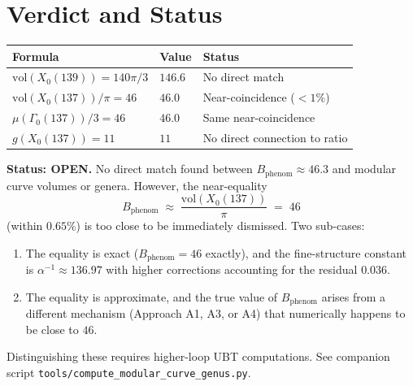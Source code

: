\documentclass[12pt,a4paper]{article}
\theoremstyle{definition}
\theoremstyle{remark}
\begin{document}
\section{Verdict and Status}
\label{sec:verdict}

\begin{center}
\begin{tabular}{lll}
  \toprule
  Formula & Value & Status \\
  \midrule
  $\mathrm{vol}(X_0(139)) = 140\pi/3$ & $146.6$ & No direct match \\
  $\mathrm{vol}(X_0(137))/\pi = 46$ & $46.0$ & Near-coincidence ($< 1\%$) \\
  $\mu(\Gamma_0(137))/3 = 46$ & $46.0$ & Same near-coincidence \\
  $g(X_0(137)) = 11$ & $11$ & No direct connection to ratio \\
  \bottomrule
\end{tabular}
\end{center}

\begin{gapbox}
\textbf{Status: OPEN.}  No direct match found between $B_{\mathrm{phenom}}
\approx 46.3$ and modular curve volumes or genera.  However, the near-equality
\[
  B_{\mathrm{phenom}} \;\approx\; \frac{\mathrm{vol}(X_0(137))}{\pi}
  \;=\; 46
\]
(within $0.65\%$) is too close to be immediately dismissed.  Two sub-cases:
\begin{enumerate}
  \item The equality is exact ($B_{\mathrm{phenom}} = 46$ exactly), and the
        fine-structure constant is $\alpha^{-1} \approx 136.97$ with higher
        corrections accounting for the residual $0.036$.
  \item The equality is approximate, and the true value of $B_{\mathrm{phenom}}$
        arises from a different mechanism (Approach A1, A3, or A4) that
        numerically happens to be close to $46$.
\end{enumerate}
Distinguishing these requires higher-loop UBT computations.
See companion script \texttt{tools/compute\_modular\_curve\_genus.py}.
\end{gapbox}

\ifdefined\INCLUDEMODE
\else
  
\end{document}
